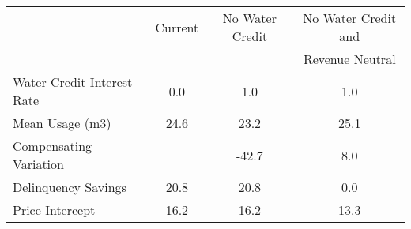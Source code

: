 \begin{tabular}{lccc}
& Current & No Water Credit & No Water Credit and \\
&         &                  & Revenue Neutral \\
Water Credit Interest Rate &0.0&1.0&1.0\\
Mean Usage (m3) &24.6&23.2&25.1\\
Compensating Variation  & &-42.7&8.0\\
Delinquency Savings  &20.8&20.8&0.0\\
Price Intercept  &16.2&16.2&13.3\\
\end{tabular} 
